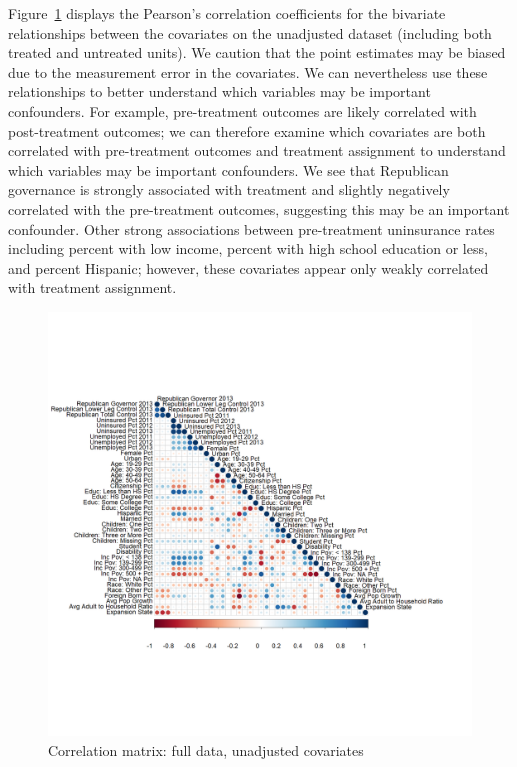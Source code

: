Figure~\ref{fig:corrmatrix} displays the Pearson's correlation coefficients for the bivariate relationships between the covariates on the unadjusted dataset (including both treated and untreated units). We caution that the point estimates may be biased due to the measurement error in the covariates. We can nevertheless use these relationships to better understand which variables may be important confounders. For example, pre-treatment outcomes are likely correlated with post-treatment outcomes; we can therefore examine which covariates are both correlated with pre-treatment outcomes and treatment assignment to understand which variables may be important confounders. We see that Republican governance is strongly associated with treatment and slightly negatively correlated with the pre-treatment outcomes, suggesting this may be an important confounder. Other strong associations between pre-treatment uninsurance rates including percent with low income, percent with high school education or less, and percent Hispanic; however, these covariates appear only weakly correlated with treatment assignment.

\begin{figure}[h!]
\begin{center}
    \caption{Correlation matrix: full data, unadjusted covariates}
    \label{fig:corrmatrix}
    \includegraphics[scale=0.25]{01_Plots/correlation-plot-c1-sigma-zero.png}
\end{center}
\end{figure}

\clearpage
